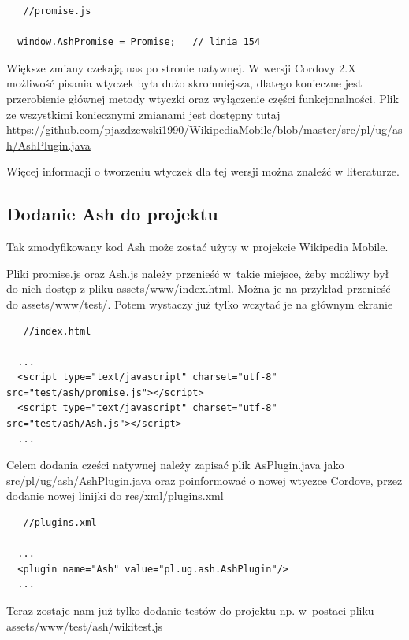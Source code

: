 \documentclass[brudnopis]{xmgr}
\begin{document}
\begin{lstlisting}
   //promise.js
  
  window.AshPromise = Promise;   // linia 154

\end{lstlisting}

Większe zmiany czekają nas po stronie natywnej. W wersji Cordovy 2.X możliwość pisania wtyczek była dużo skromniejsza, dlatego konieczne jest przerobienie głównej metody wtyczki oraz wyłączenie części funkcjonalności. Plik ze wszystkimi koniecznymi zmianami jest dostępny tutaj \url{https://github.com/pjazdzewski1990/WikipediaMobile/blob/master/src/pl/ug/ash/AshPlugin.java}

Więcej informacji o tworzeniu wtyczek dla tej wersji można znaleźć w literaturze\cite{Ghatol-Patel}.

\subsection{Dodanie Ash do projektu}

Tak zmodyfikowany kod Ash może zostać użyty w projekcie Wikipedia Mobile.

Pliki promise.js oraz Ash.js należy przenieść w~takie miejsce, żeby możliwy był do nich dostęp z pliku assets/www/index.html. Można je na przykład przenieść do assets/www/test/. Potem wystaczy już tylko wczytać je na głównym ekranie 

\begin{lstlisting}
   //index.html
  
  ...
  <script type="text/javascript" charset="utf-8" src="test/ash/promise.js"></script>
  <script type="text/javascript" charset="utf-8" src="test/ash/Ash.js"></script>
  ...

\end{lstlisting}

Celem dodania cześci natywnej należy zapisać plik AsPlugin.java jako src/pl/ug/ash/AshPlugin.java oraz poinformować o nowej wtyczce Cordove, przez dodanie nowej linijki do res/xml/plugins.xml

\begin{lstlisting}
   //plugins.xml
  
  ...
  <plugin name="Ash" value="pl.ug.ash.AshPlugin"/>
  ...

\end{lstlisting}

Teraz zostaje nam już tylko dodanie testów do projektu np. w~postaci pliku  assets/www/test/ash/wikitest.js 
\end{document}
